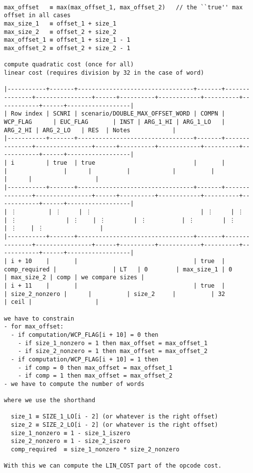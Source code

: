 \documentclass[varwidth=\maxdimen,margin=0.5cm,multi={verbatim}]{standalone}
\begin{document}
\begin{verbatim}

max_offset   ≡ max(max_offset_1, max_offset_2)   // the ``true'' max offset in all cases
max_size_1   ≡ offset_1 + size_1
max_size_2   ≡ offset_2 + size_2
max_offset_1 ≡ offset_1 + size_1 - 1
max_offset_2 ≡ offset_2 + size_2 - 1

compute quadratic cost (once for all)
linear cost (requires division by 32 in the case of word)

|-----------+-------+---------------------------------+-------+---------------+----------------+------+----------+------------+----------+------------+------+------------------|
| Row index | SCNRI | scenario/DOUBLE_MAX_OFFSET_WORD | COMPN | WCP_FLAG      | EUC_FLAG       | INST | ARG_1_HI | ARG_1_LO   | ARG_2_HI | ARG_2_LO   | RES  | Notes            |
|-----------+-------+---------------------------------+-------+---------------+----------------+------+----------+------------+----------+------------+------+------------------|
| i         | true  | true                            |       |               |                |      |          |            |          |            |      |                  |
|-----------+-------+---------------------------------+-------+---------------+----------------+------+----------+------------+----------+------------+------+------------------|
| ⋮         | ⋮     | ⋮                               | ⋮     | ⋮             | ⋮              | ⋮    | ⋮        | ⋮          | ⋮        | ⋮          | ⋮    | ⋮                |
|-----------+-------+---------------------------------+-------+---------------+----------------+------+----------+------------+----------+------------+------+------------------|
| i + 10    |       |                                 | true  | comp_required |                | LT   | 0        | max_size_1 | 0        | max_size_2 | comp | we compare sizes |
| i + 11    |       |                                 | true  |               | size_2_nonzero |      |          | size_2     |          | 32         | ceil |                  |

we have to constrain
- for max_offset:
  - if computation/WCP_FLAG[i + 10] = 0 then
    - if size_1_nonzero = 1 then max_offset = max_offset_1
    - if size_2_nonzero = 1 then max_offset = max_offset_2
  - if computation/WCP_FLAG[i + 10] = 1 then
    - if comp = 0 then max_offset = max_offset_1
    - if comp = 1 then max_offset = max_offset_2
- we have to compute the number of words

where we use the shorthand

  size_1 ≡ SIZE_1_LO[i - 2] (or whatever is the right offset)
  size_2 ≡ SIZE_2_LO[i - 2] (or whatever is the right offset)
  size_1_nonzero ≡ 1 - size_1_iszero
  size_2_nonzero ≡ 1 - size_2_iszero
  comp_required  ≡ size_1_nonzero * size_2_nonzero

With this we can compute the LIN_COST part of the opcode cost.



\end{verbatim}
\end{document}
